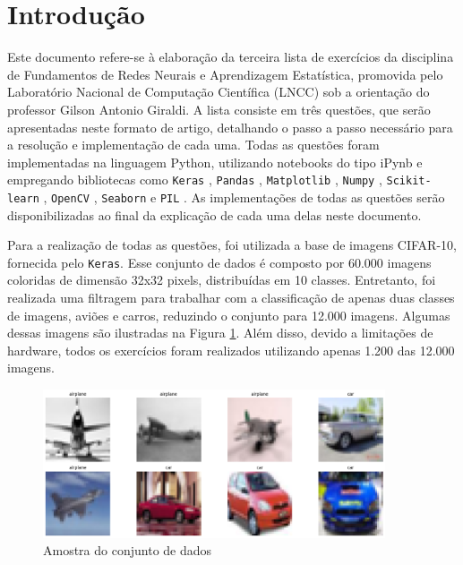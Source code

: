 \documentclass[]{abntex2}
\begin{document}
\frenchspacing 

\maketitle

\section*{\textbf{Introdução}}

Este documento refere-se à elaboração da terceira lista de exercícios da disciplina de Fundamentos de Redes Neurais e Aprendizagem Estatística, promovida pelo Laboratório Nacional de Computação Científica (LNCC) sob a orientação do professor Gilson Antonio Giraldi. A lista consiste em três questões, que serão apresentadas neste formato de artigo, detalhando o passo a passo necessário para a resolução e implementação de cada uma. Todas as questões foram implementadas na linguagem Python, utilizando notebooks do tipo iPynb e empregando bibliotecas como \texttt{Keras} \cite{keras}, \texttt{Pandas} \cite{pandas}, \texttt{Matplotlib} \cite{matplotlib}, \texttt{Numpy} \cite{numpy}, \texttt{Scikit-learn} \cite{scikit-learn}, \texttt{OpenCV} \cite{opencv}, \texttt{Seaborn} \cite{seaborn} e \texttt{PIL} \cite{pillow}. As implementações de todas as questões serão disponibilizadas ao final da explicação de cada uma delas neste documento.

Para a realização de todas as questões, foi utilizada a base de imagens CIFAR-10, fornecida pelo \texttt{Keras}. Esse conjunto de dados é composto por 60.000 imagens coloridas de dimensão 32x32 pixels, distribuídas em 10 classes. Entretanto, foi realizada uma filtragem para trabalhar com a classificação de apenas duas classes de imagens, aviões e carros, reduzindo o conjunto para 12.000 imagens. Algumas dessas imagens são ilustradas na Figura \ref{fig:amostra}. Além disso, devido a limitações de hardware, todos os exercícios foram realizados utilizando apenas 1.200 das 12.000 imagens.

\begin{figure}[H]
    \centering 
    \includegraphics[width=0.9\textwidth]{imgs/introduction/amostra.png}
    \caption{Amostra do conjunto de dados}
    \label{fig:amostra} %
\end{figure}
\end{document}
